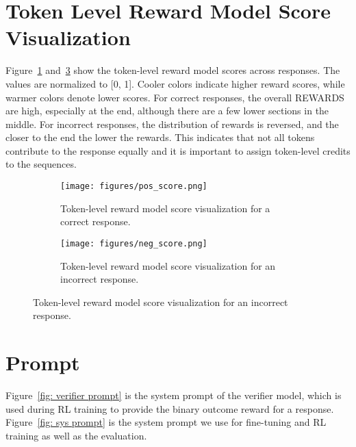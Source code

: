 \section{Token Level Reward Model Score Visualization}
\label{sec: vis_token}

Figure~\ref{fig:token_score_correct} and~\ref{fig:token_score_incorrect} show the token-level reward model scores across responses. The values are normalized to [0, 1]. Cooler colors indicate higher reward scores, while warmer colors denote lower scores.
For correct responses, the overall REWARDS are high, especially at the end, although there are a few lower sections in the middle. For incorrect responses, the distribution of rewards is reversed, and the closer to the end the lower the rewards.
This indicates that not all tokens contribute to the response equally and it is important to assign token-level credits to the sequences.

\begin{figure}[htbp]
    \centering

    \begin{subfigure}
        \centering
        \texttt{[image: figures/pos\_score.png]} 
        \caption{Token-level reward model score visualization for a correct response.}
        \label{fig:token_score_correct}
    \end{subfigure}
    \hfill

    \begin{subfigure}
        \centering
        \texttt{[image: figures/neg\_score.png]}
        \caption{Token-level reward model score visualization for an incorrect response.}
        \label{fig:token_score_incorrect}
    \end{subfigure}

\end{figure}


\section{Prompt}

Figure~\ref{fig: verifier prompt} is the system prompt of the verifier model, which is used during RL training to provide the binary outcome reward for a response.
Figure~\ref{fig: sys prompt} is the system prompt we use for fine-tuning and RL training as well as the evaluation.

